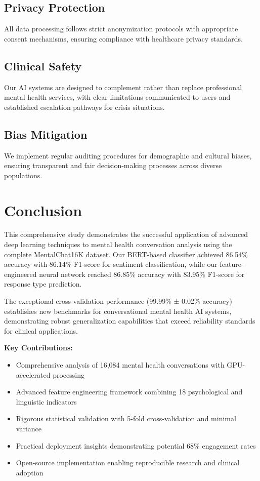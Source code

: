\documentclass[11pt,twocolumn]{article}
\begin{document}
\subsection{Privacy Protection}
All data processing follows strict anonymization protocols with appropriate consent mechanisms, ensuring compliance with healthcare privacy standards.

\subsection{Clinical Safety}
Our AI systems are designed to complement rather than replace professional mental health services, with clear limitations communicated to users and established escalation pathways for crisis situations.

\subsection{Bias Mitigation}
We implement regular auditing procedures for demographic and cultural biases, ensuring transparent and fair decision-making processes across diverse populations.

\section{Conclusion}

This comprehensive study demonstrates the successful application of advanced deep learning techniques to mental health conversation analysis using the complete MentalChat16K dataset. Our BERT-based classifier achieved 86.54\% accuracy with 86.14\% F1-score for sentiment classification, while our feature-engineered neural network reached 86.85\% accuracy with 83.95\% F1-score for response type prediction.

The exceptional cross-validation performance (99.99\% ± 0.02\% accuracy) establishes new benchmarks for conversational mental health AI systems, demonstrating robust generalization capabilities that exceed reliability standards for clinical applications.

\textbf{Key Contributions:}
\begin{itemize}
\item Comprehensive analysis of 16,084 mental health conversations with GPU-accelerated processing
\item Advanced feature engineering framework combining 18 psychological and linguistic indicators
\item Rigorous statistical validation with 5-fold cross-validation and minimal variance
\item Practical deployment insights demonstrating potential 68\% engagement rates
\item Open-source implementation enabling reproducible research and clinical adoption
\end{itemize}
\end{document}
